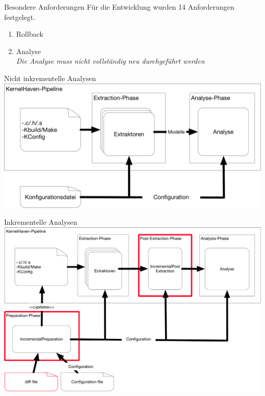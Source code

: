 \documentclass[compress, aspectratio=43, noserifmath]{beamer}
\begin{document}
\begin{frame}{Besondere Anforderungen}
F\"ur die Entwicklung wurden 14 Anforderungen festgelegt.
\begin{enumerate}
	\item Rollback \\
	\emph{}
	\item Analyse \\
	\emph{Die Analyse muss nicht vollst\"andig neu durchgef\"uhrt werden}
\end{enumerate}
\end{frame}



\begin{frame}{Nicht inkrementelle Analysen}
\includegraphics[width=1\textwidth]{image/KernelHaven.pdf}

\end{frame}


\begin{frame}{Inkrementelle Analysen}
\includegraphics[width=1\textwidth]{image/KernelHavenIncremental.pdf}
\end{frame}
\end{document}
